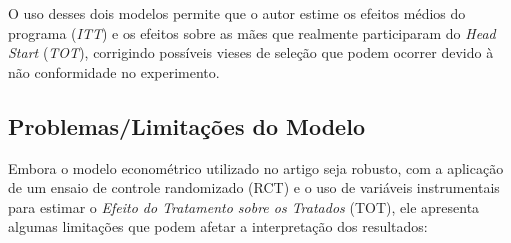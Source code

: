 \documentclass[a4paper,12pt]{article}[abntex2]
\begin{document}
O uso desses dois modelos permite que o autor estime os efeitos médios do programa (\textit{ITT}) e os efeitos sobre as mães que realmente participaram do \textit{Head Start} (\textit{TOT}), corrigindo possíveis vieses de seleção que podem ocorrer devido à não conformidade no experimento.

\subsection{\textbf{Problemas/Limitações do Modelo}}
Embora o modelo econométrico utilizado no artigo seja robusto, com a aplicação de um ensaio de controle randomizado (RCT) e o uso de variáveis instrumentais para estimar o \textit{Efeito do Tratamento sobre os Tratados} (TOT), ele apresenta algumas limitações que podem afetar a interpretação dos resultados:
\end{document}
